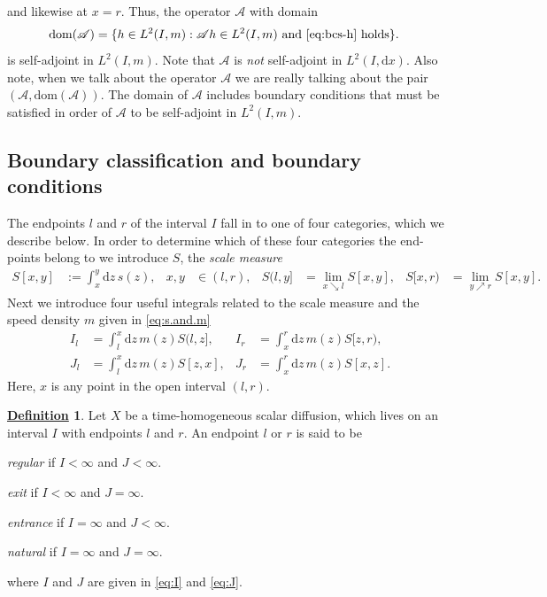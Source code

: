 \documentclass[12pt]{book}
\numberwithin{equation}{chapter}
\theoremstyle{plain}
\numberwithin{theorem}{section}
\theoremstyle{definition}
\newtheorem{definition}[theorem]{\underline{Definition}}
\numberwithin{exercise}{chapter}
\newcommand{\<}{\langle}
\renewcommand{\>}{\rangle}
\renewcommand{\(}{\left(}
\renewcommand{\)}{\right)}
\renewcommand{\[}{\left[}
\renewcommand{\]}{\right]}
\newcommand\Ac{\mathscr{A}}
\newcommand\dd{\mathrm{d}}
\begin{document}
and likewise at $x=r$. Thus, the operator $\Ac$ with domain
\begin{align}
\text{dom}(\Ac)
	&=	\{ h \in L^2(I,m) : \Ac h \in L^2(I,m) \text{ and \eqref{eq:bcs-h} holds} \} .
\end{align}
is self-adjoint in $L^2(I,m)$.  
Note that $\Ac$ is \emph{not} self-adjoint in $L^2(I,\dd x)$.
Also note, when we talk about the operator $\Ac$ we are really talking about the pair $(\Ac, \text{dom}(\Ac))$.  The domain of $\Ac$ includes boundary conditions that must be satisfied in order of $\Ac$ to be self-adjoint in $L^2(I,m)$.

\subsection*{Boundary classification and boundary conditions}
The endpoints $l$ and $r$ of the interval $I$ fall in to one of four categories, which we describe below.
In order to determine which of these four categories the end-points belong to we introduce $S$, the \emph{scale measure}
\begin{align}
S[x,y]
	&:=	\int_x^y \dd z \, s(z) , &
x,y
	&\in (l,r) , &
S(l,y]
	&=	\lim_{x \searrow l} S[x,y] , &
S[x,r)
	&=	\lim_{y \nearrow r} S[x,y] . &
\end{align}
Next we introduce four useful integrals related to the scale measure and the speed density $m$ given in \eqref{eq:s.and.m}
\begin{align}
I_l
	&=  \int_l^x \dd z \, m(z) S(l,z] , &
I_r
	&=	\int_x^r \dd z \, m(z) S[z,r) , \label{eq:I} \\
J_l
	&=	\int_l^x \dd z \, m(z) S[z,x] , &
J_r
	&=	\int_x^r \dd z \, m(z) S[x,z] . \label{eq:J}
\end{align}
Here, $x$ is any point in the open interval $(l,r)$.

\begin{definition}
Let $X$ be a time-homogeneous scalar diffusion, which lives on an interval $I$ with endpoints $l$ and $r$.
An endpoint $l$ or $r$ is said to be
\begin{itemize*}
\item \emph{regular} if $I<\infty$ and $J<\infty$.
\item \emph{exit} if $I<\infty$ and $J=\infty$.
\item \emph{entrance} if $I=\infty$ and $J<\infty$.
\item \emph{natural} if $I=\infty$ and $J=\infty$.
\end{itemize*}
where $I$ and $J$ are given in \eqref{eq:I} and \eqref{eq:J}.
\end{definition}
\end{document}
